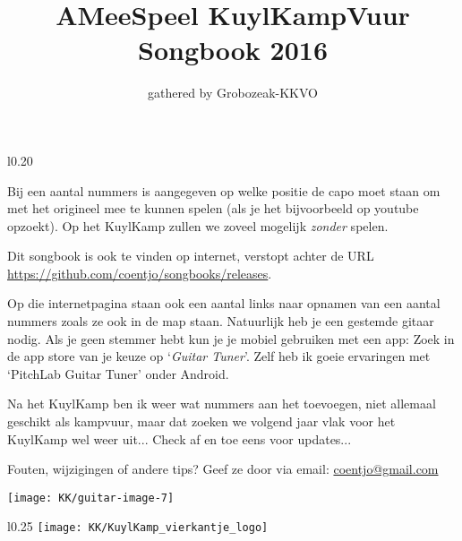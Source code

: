 \documentclass[a4,openany,portrait,tikz]{article}
\title{AMeeSpeel KuylKampVuur Songbook 2016}
\author{gathered by Grobozeak-KKVO}
\begin{document}

\maketitle 



 
\begin{wrapfigure}{l}{0.20\textwidth}

\end{wrapfigure}


Bij een aantal nummers is aangegeven op welke positie de capo moet staan om met het origineel mee te kunnen spelen (als je het bijvoorbeeld op youtube opzoekt). Op het KuylKamp zullen we zoveel mogelijk \emph{zonder} spelen.  

Dit songbook is ook te vinden op internet, verstopt achter de URL \url{https://github.com/coentjo/songbooks/releases}. 

Op die internetpagina staan ook een aantal links naar opnamen van een aantal nummers zoals ze ook in de map staan.  
Natuurlijk heb je een gestemde gitaar nodig. Als je geen stemmer hebt kun je je mobiel gebruiken met een app: Zoek in de app store van je keuze op `\emph{Guitar Tuner}'. Zelf heb ik goeie ervaringen met `PitchLab Guitar Tuner' onder Android. 

Na het KuylKamp ben ik weer wat nummers aan het toevoegen, niet allemaal geschikt als kampvuur, maar dat zoeken we volgend jaar vlak voor het KuylKamp wel weer uit... Check af en toe eens voor updates... 

Fouten, wijzigingen of andere tips? Geef ze door via email:   \href{mailto:coentjo@gmail.com}{coentjo@gmail.com} 

\texttt{[image: KK/guitar-image-7]} 


\begin{wrapfigure}{l}{0.25\textwidth}
\texttt{[image: KK/KuylKamp\_vierkantje\_logo]} 
\end{wrapfigure}


\end{document}
